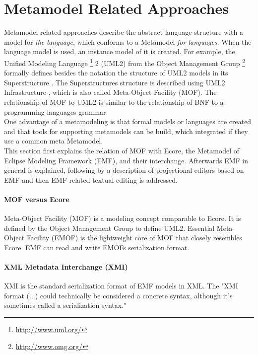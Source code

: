 \section{Metamodel Related Approaches} \label{sec:metaApproaches}
Metamodel related approaches describe the abstract language structure with a model for \emph{the language}, which conforms to a Metamodel \emph{for languages}. When the language model is used, an instance model of it is created. For example, the Unified Modeling Language \footnote{\raggedright \url{http://www.uml.org/}}  2 (UML2) from the Object Management Group \footnote{\raggedright \url{http://www.omg.org/}} formally defines besides the notation the structure of UML2 models in its Superstructure \cite{Uml23s}. The Superstructures structure is described using UML2 Infrastructure \cite{Uml23i}, which is also called Meta-Object Facility (MOF). The relationship of MOF to UML2 is similar to the relationship of BNF to a programming languages grammar.\\
One advantage of a metamodeling is that formal models or languages are created and that tools for supporting metamodels can be build, which integrated if they use a common meta Metamodel.\\

This section first explains the relation of MOF with Ecore, the Metamodel of Eclipse Modeling Framework (EMF), and their interchange. Afterwards EMF in general is explained, following by a description of projectional editors based on EMF and then EMF related textual editing is addressed.

\paragraph{MOF versus Ecore}
Meta-Object Facility (MOF) is a modeling concept comparable to Ecore. It is defined by the Object Management Group \cite{OMG} to define UML2. Essential Meta-Object Facility (EMOF) is the lightweight core of MOF that closely resembles Ecore. EMF can read and write EMOFs serialization format. \cite{EMP}

\paragraph{XML Metadata Interchange (XMI)}
XMI is the standard serialization format of EMF models in XML. The "XMI format (...) could technically be considered a concrete syntax, although it's sometimes called a serialization syntax." \cite{EMP}


